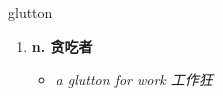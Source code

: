 
\begin{frame}
{\huge glutton}
\begin{center}
\begin{enumerate}\Large
  \item \textbf{n. 贪吃者}
  \begin{itemize}
    \item \em{\Large{a glutton for work 工作狂}}
  \end{itemize}
\end{enumerate}
\end{center}
\end{frame}
